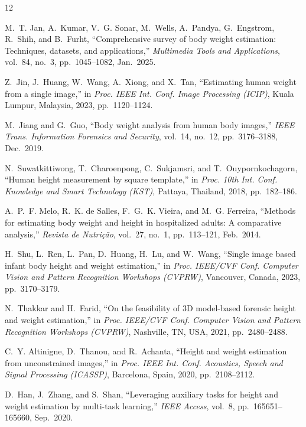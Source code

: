 \documentclass[conference]{IEEEtran}
\begin{document}
\FloatBarrier
\balance
\begin{thebibliography}{12}

M.~T. Jan, A.~Kumar, V.~G. Sonar, M.~Wells, A.~Pandya, G.~Engstrom, R.~Shih, and B.~Furht, ``Comprehensive survey of body weight estimation: Techniques, datasets, and applications,'' \textit{Multimedia Tools and Applications}, vol.~84, no.~3, pp.~1045--1082, Jan.~2025.

Z.~Jin, J.~Huang, W.~Wang, A.~Xiong, and X.~Tan, ``Estimating human weight from a single image,'' in \textit{Proc. IEEE Int. Conf. Image Processing (ICIP)}, Kuala Lumpur, Malaysia, 2023, pp.~1120--1124.

M.~Jiang and G.~Guo, ``Body weight analysis from human body images,'' \textit{IEEE Trans. Information Forensics and Security}, vol.~14, no.~12, pp.~3176--3188, Dec.~2019.

N.~Suwatkittiwong, T.~Charoenpong, C.~Sukjamsri, and T.~Ouypornkochagorn, ``Human height measurement by square template,'' in \textit{Proc. 10th Int. Conf. Knowledge and Smart Technology (KST)}, Pattaya, Thailand, 2018, pp.~182--186.

A.~P.~F. Melo, R.~K. de Salles, F.~G.~K. Vieira, and M.~G. Ferreira, ``Methods for estimating body weight and height in hospitalized adults: A comparative analysis,'' \textit{Revista de Nutri{\c{c}}{\~a}o}, vol.~27, no.~1, pp.~113--121, Feb.~2014.

H.~Shu, L.~Ren, L.~Pan, D.~Huang, H.~Lu, and W.~Wang, ``Single image based infant body height and weight estimation,'' in \textit{Proc. IEEE/CVF Conf. Computer Vision and Pattern Recognition Workshops (CVPRW)}, Vancouver, Canada, 2023, pp.~3170--3179.

N.~Thakkar and H.~Farid, ``On the feasibility of 3D model-based forensic height and weight estimation,'' in \textit{Proc. IEEE/CVF Conf. Computer Vision and Pattern Recognition Workshops (CVPRW)}, Nashville, TN, USA, 2021, pp.~2480--2488.

C.~Y. Altinigne, D.~Thanou, and R.~Achanta, ``Height and weight estimation from unconstrained images,'' in \textit{Proc. IEEE Int. Conf. Acoustics, Speech and Signal Processing (ICASSP)}, Barcelona, Spain, 2020, pp.~2108--2112.

D.~Han, J.~Zhang, and S.~Shan, ``Leveraging auxiliary tasks for height and weight estimation by multi-task learning,'' \textit{IEEE Access}, vol.~8, pp.~165651--165660, Sep.~2020.


\end{thebibliography}
\end{document}

